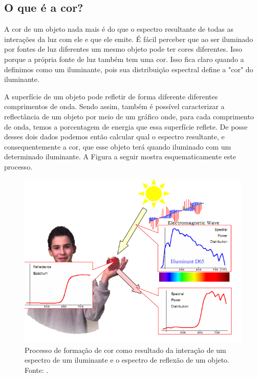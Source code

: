 \documentclass[a4paper,10pt]{report}
\begin{document}
\subsection{O que é a cor?}
\par
A cor de um objeto nada mais é do que o espectro resultante de todas as
interações da luz com ele e que ele emite. É fácil perceber que ao ser iluminado
por fontes de luz diferentes um mesmo objeto pode ter cores diferentes. Isso
porque a própria fonte de luz também tem uma cor. Isso fica claro quando a
definimos como um iluminante, pois sua distribuição espectral define a "cor" do
iluminante.

\par
A superfície de um objeto pode refletir de forma diferente diferentes
comprimentos de onda. Sendo assim, também é possível caracterizar a
reflectância de um objeto por meio de um gráfico onde, para cada comprimento de
onda, temos a porcentagem de energia que essa superfície reflete. De posse
desses dois dados podemos então calcular qual o espectro resultante, e
consequentemente a cor, que esse objeto terá quando iluminado com um
determinado iluminante. A Figura a seguir mostra esquematicamente este processo.

\begin{figure}[!htb]
     \centering
     \includegraphics[scale=0.9]{img/what_is_color.png}
     \caption{Processo de formação de cor como resultado da interação de um
espectro de um iluminante e o espectro de reflexão de um objeto. Fonte:
.}
     \label{fig:what_is_color}
\end{figure}
\end{document}
